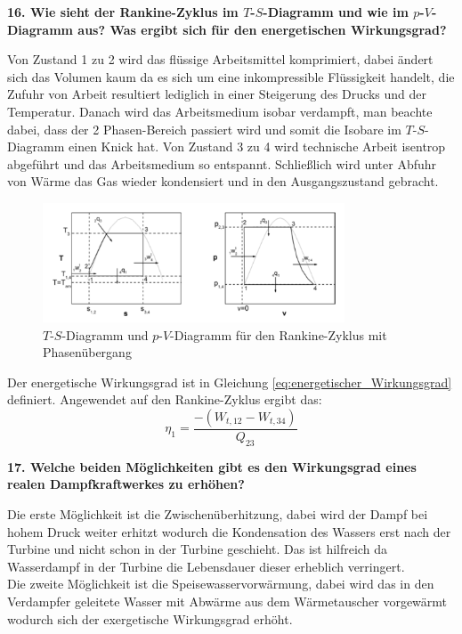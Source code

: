 \noindent \textbf{16. Wie sieht der Rankine-Zyklus im $T$-$S$-Diagramm und wie im $p$-$V$-Diagramm aus? Was ergibt sich für den energetischen Wirkungsgrad?}\\
\begin{addmargin}[25pt]{0pt}
Von Zustand 1 zu 2 wird das flüssige Arbeitsmittel komprimiert, dabei ändert sich das Volumen kaum da es sich um eine inkompressible Flüssigkeit handelt, die Zufuhr von Arbeit resultiert lediglich in einer Steigerung des Drucks und der Temperatur. Danach wird das Arbeitsmedium isobar verdampft, man beachte dabei, dass der 2 Phasen-Bereich passiert wird und somit die Isobare im $T$-$S$-Diagramm einen Knick hat. Von Zustand 3 zu 4 wird technische Arbeit isentrop abgeführt und das Arbeitsmedium so entspannt. Schließlich wird unter Abfuhr von Wärme das Gas wieder kondensiert und in den Ausgangszustand gebracht. 
\begin{figure}[h]
    \centering
    \includegraphics[width = 0.8\textwidth]{images/Energiewissenschaften/Rankinezyklus.png}
    \caption{$T$-$S$-Diagramm und $p$-$V$-Diagramm für den Rankine-Zyklus mit Phasenübergang}
    \label{fig:Rankinezyklus}
\end{figure}
Der energetische Wirkungsgrad ist in Gleichung \ref{eq:energetischer_Wirkungsgrad} definiert. Angewendet auf den Rankine-Zyklus ergibt das:
\begin{equation}\label{eq:Rankine_energetischer_Wirkungsgrad}
   \eta_1 = \frac{-(W_{t,12}-W_{t,34})}{Q_{23}} 
\end{equation}

\end{addmargin}

\noindent \textbf{17. Welche beiden Möglichkeiten gibt es den Wirkungsgrad eines realen Dampfkraftwerkes zu erhöhen?}\\
\begin{addmargin}[25pt]{0pt}
Die erste Möglichkeit ist die Zwischenüberhitzung, dabei wird der Dampf bei hohem Druck weiter erhitzt wodurch die Kondensation des Wassers erst nach der Turbine und nicht schon in der Turbine geschieht. Das ist hilfreich da Wasserdampf in der Turbine die Lebensdauer dieser erheblich verringert.\\ Die zweite Möglichkeit ist die Speisewasservorwärmung, dabei wird das in den Verdampfer geleitete Wasser mit Abwärme aus dem Wärmetauscher vorgewärmt wodurch sich der exergetische Wirkungsgrad erhöht.   \\
\end{addmargin}

